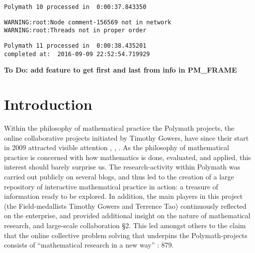 \documentclass[article, floatfix, groupaddress, prb]{revtex4-1}
\begin{document}
    \begin{Verbatim}[commandchars=\\\{\}]
Polymath 10 processed in  0:00:37.843350

    \end{Verbatim}

    \begin{Verbatim}[commandchars=\\\{\}]
WARNING:root:Node comment-156569 not in network
WARNING:root:Threads not in proper order

    \end{Verbatim}

    \begin{Verbatim}[commandchars=\\\{\}]
Polymath 11 processed in  0:00:38.435201
completed at:  2016-09-09 22:52:54.719929

    \end{Verbatim}













    \textbf{To Do: add feature to get first and last from info in PM\_FRAME}

    \section{Introduction}\label{introduction}

Within the philosophy of mathematical practice the Polymath projects,
the online collaborative projects initiated by Timothy Gowers, have
since their start in 2009 attracted visible attention
\cite{763884/WXE3J6GJ}, \cite{763884/RXTHUZGM}, \cite{763884/ICNJ8I5P}.
As the philosophy of mathematical practice is concerned with how
mathematics is done, evaluated, and applied, this interest should barely
surprise us. The research-activity within Polymath was carried out
publicly on several blogs, and thus led to the creation of a large
repository of interactive mathematical practice in action: a treasure of
information ready to be explored. In addition, the main players in this
project (the Field-medallists Timothy Gowers and Terrence Tao)
continuously reflected on the enterprise, and provided additional
insight on the nature of mathematical research, and large-scale
collaboration \cite{763884/QSM6KVB6} §2. This led amongst others to the
claim that the online collective problem solving that underpins the
Polymath-projects consists of ``mathematical research in a new way''
\cite{763884/TVHHE2TD}: 879.
\end{document}
